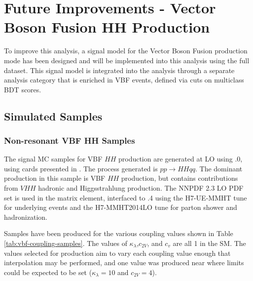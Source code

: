 
\chapter{Future Improvements - Vector Boson Fusion HH Production}

To improve this analysis, a signal model for the Vector Boson Fusion production mode has been designed and will be implemented into this analysis using the full \RunTwo dataset. This signal model is integrated into the analysis through a separate analysis category that is enriched in VBF events, defined via cuts on multiclass \gls{BDT} scores.

\section{Simulated Samples}

\subsection{Non-resonant VBF HH Samples}

The signal MC samples for VBF $HH$ production are generated at LO using .0, using cards presented in \cite{vbfhh}. The process generated is $pp \rightarrow HHqq$. The dominant production in this sample is VBF $HH$ production, but contains contributions from $VHH$  hadronic and Higgsstrahlung production. The NNPDF 2.3 LO PDF set \cite{NNPDF} is used in the matrix element, interfaced to .4 using the H7-UE-MMHT tune for underlying events and the H7-MMHT2014LO tune for parton shower and hadronization.

Samples have been produced for the various coupling values shown in Table \ref{tab:vbf-coupling-samples}. The values of $\kappa_\lambda$,$c_{2V}$, and $c_{v}$ are all 1 in the SM. The values selected for production aim to vary each coupling value enough that interpolation may be performed, and one value was produced near where limits could be expected to be set ($\kappa_\lambda = 10$ and $c_{2V}=4$).

